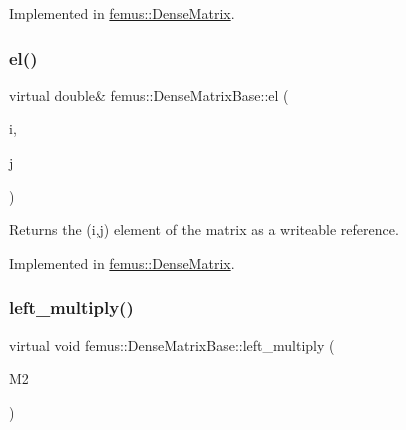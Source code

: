 Implemented in \mbox{\hyperlink{classfemus_1_1_dense_matrix_a3b37181274fbe8eca1523acdecb59bd0}{femus\+::\+Dense\+Matrix}}.

\mbox{\label{classfemus_1_1_dense_matrix_base_ab1f58e98ca5000e197fce3013a019dc4}} 
\subsubsection{\texorpdfstring{el()}{el()}\hspace{0.1cm}{\footnotesize\ttfamily [2/2]}}
{\footnotesize\ttfamily virtual double\& femus\+::\+Dense\+Matrix\+Base\+::el (\begin{DoxyParamCaption}\item[{const int}]{i,  }\item[{const int}]{j }\end{DoxyParamCaption})\hspace{0.3cm}{\ttfamily [pure virtual]}}

\begin{DoxyReturn}{Returns}
the {\ttfamily }(i,j) element of the matrix as a writeable reference. 
\end{DoxyReturn}


Implemented in \mbox{\hyperlink{classfemus_1_1_dense_matrix_a9867b5e9b16b8ec746ebde4270239248}{femus\+::\+Dense\+Matrix}}.

\mbox{\label{classfemus_1_1_dense_matrix_base_af08f7a07a6b6a9486502a8af234de32c}} 
\subsubsection{\texorpdfstring{left\+\_\+multiply()}{left\_multiply()}}
{\footnotesize\ttfamily virtual void femus\+::\+Dense\+Matrix\+Base\+::left\+\_\+multiply (\begin{DoxyParamCaption}\item[{const \mbox{\hyperlink{classfemus_1_1_dense_matrix_base}{Dense\+Matrix\+Base}} \&}]{M2 }\end{DoxyParamCaption})\hspace{0.3cm}{\ttfamily [pure virtual]}}




